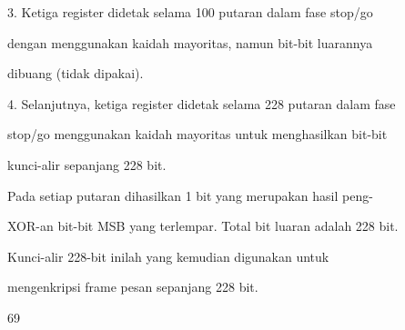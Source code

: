 \documentclass{article}
\begin{document}

3. Ketiga register didetak selama 100 putaran dalam fase stop/go 

dengan menggunakan kaidah mayoritas, namun bit-bit luarannya 

dibuang (tidak dipakai).

4. Selanjutnya, ketiga register didetak selama 228 putaran dalam fase 

stop/go menggunakan kaidah mayoritas untuk menghasilkan bit-bit 

kunci-alir sepanjang 228 bit. 

Pada setiap putaran dihasilkan 1 bit yang merupakan hasil peng-

XOR-an bit-bit MSB yang terlempar. Total bit luaran adalah 228 bit. 

Kunci-alir 228-bit inilah yang kemudian digunakan untuk 

mengenkripsi frame pesan sepanjang 228 bit.

69
\end{document}
